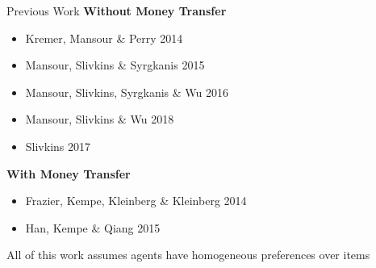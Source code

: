 \documentclass[serif]{beamer}
\begin{document}
\begin{frame}{Previous Work}
\textbf{Without Money Transfer}\\
\small{
\begin{itemize}[label=\textbullet]
\item Kremer, Mansour \& Perry 2014
\item Mansour, Slivkins \& Syrgkanis 2015
\item Mansour, Slivkins, Syrgkanis \& Wu 2016
\item Mansour, Slivkins \& Wu 2018
\item Slivkins 2017
\end{itemize}
}
\vspace{0.5cm}
\textbf{With Money Transfer}\\
\small{
\begin{itemize}[label=\textbullet]
\item Frazier, Kempe, Kleinberg \& Kleinberg 2014
\item Han, Kempe \& Qiang 2015
\end{itemize}

All of this work assumes agents have homogeneous preferences over items 
}
\end{frame}

\end{document}
